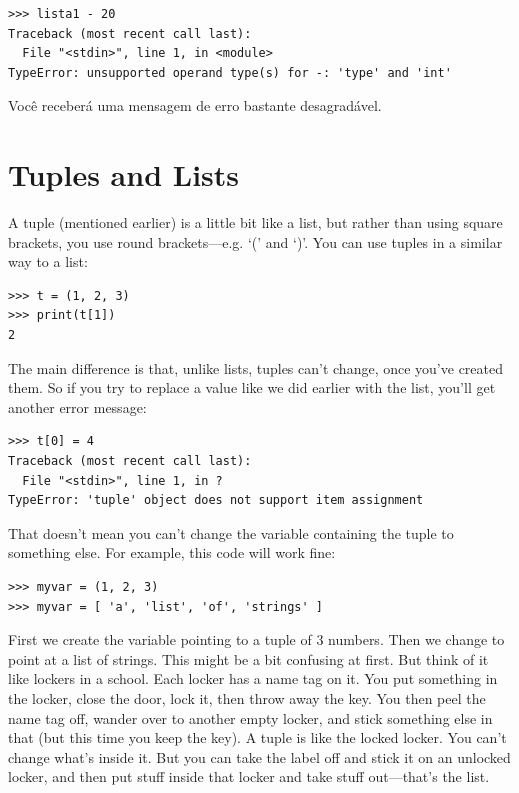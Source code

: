 \begin{listing}
\begin{verbatim}
>>> lista1 - 20
Traceback (most recent call last):
  File "<stdin>", line 1, in <module>
TypeError: unsupported operand type(s) for -: 'type' and 'int'
\end{verbatim}
\end{listing}

\noindent
Você receberá uma mensagem de erro bastante desagradável.

\section{Tuples and Lists}\label{tuplesandlists}

A tuple (mentioned earlier) is a little bit like a list, but rather than using square brackets, you use round brackets---e.g. `(' and `)'.  You can use tuples in a similar way to a list:

\begin{listing}
\begin{verbatim}
>>> t = (1, 2, 3)
>>> print(t[1])
2
\end{verbatim}
\end{listing}

The main difference is that, unlike lists, tuples can't change, once you've created them.  So if you try to replace a value like we did earlier with the list, you'll get another error message:

\begin{listing}
\begin{verbatim}
>>> t[0] = 4
Traceback (most recent call last):
  File "<stdin>", line 1, in ?
TypeError: 'tuple' object does not support item assignment
\end{verbatim}
\end{listing}

That doesn't mean you can't change the variable containing the tuple to something else.  For example, this code will work fine:

\begin{listing}
\begin{verbatim}
>>> myvar = (1, 2, 3)
>>> myvar = [ 'a', 'list', 'of', 'strings' ]
\end{verbatim}
\end{listing}

First we create the variable  pointing to a tuple of 3 numbers.  Then we change  to point at a list of strings. This might be a bit confusing at first.  But think of it like lockers in a school.  Each locker has a name tag on it. You put something in the locker, close the door, lock it, then throw away the key.  You then peel the name tag off, wander over to another empty locker, and stick something else in that (but this time you keep the key).  A tuple is like the locked locker.  You can't change what's inside it.  But you can take the label off and stick it on an unlocked locker, and then put stuff inside that locker and take stuff out---that's the list.

